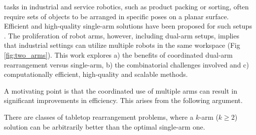 
 tasks in industrial and service robotics, such as product packing or sorting, often require sets of objects to be arranged in
specific poses on a planar surface. Efficient and high-quality
single-arm solutions have been proposed for such
setups \cite{193}. The proliferation of robot arms, however, including dual-arm setups, implies that industrial settings can utilize multiple robots in the same workspace (Fig \ref{fig:two_arms}). This work explores a) the benefits of coordinated dual-arm rearrangement versus single-arm, b) the combinatorial challenges involved and c) computationally efficient, high-quality and scalable methods.

 


A motivating point is that the coordinated use of multiple arms can
result in significant improvements in efficiency. This arises from the following argument.

\begin{lemma}\label{l:k-arm-lower-bound}
There are classes of tabletop rearrangement problems, where a $k$-arm
($k \ge 2$) solution can be arbitrarily better than the optimal
single-arm one.
\end{lemma}

